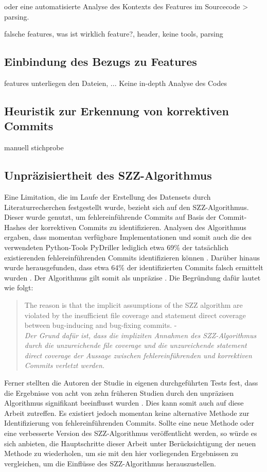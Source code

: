 oder eine automatisierte Analyse des Kontexts des Features im Sourcecode > parsing.


falsche features, was ist wirklich feature?, header, keine tools, parsing

\subsection*{Einbindung des Bezugs zu Features}
features unterliegen den Dateien, ... Keine in-depth Analyse des Codes

\subsection*{Heuristik zur Erkennung von korrektiven Commits}
manuell
stichprobe

\subsection*{Unpräzisiertheit des SZZ-Algorithmus}

Eine Limitation, die im Laufe der Erstellung des Datensets durch Literaturrecherchen festgestellt wurde, bezieht sich auf den SZZ-Algorithmus. Dieser wurde genutzt, um fehlereinführende Commits auf Basis der Commit-Hashes der korrektiven Commits zu identifizieren. Analysen des Algorithmus ergaben, dass momentan verfügbare Implementationen und somit auch die des verwendeten Python-Tools PyDriller lediglich etwa 69\% der tatsächlich existierenden fehlereinführenden Commits identifizieren können \cite{Wen2019}. Darüber hinaus wurde herausgefunden, dass etwa 64\% der identifizierten Commits falsch ermittelt wurden \cite{Wen2019}. Der Algorithmus gilt somit als unpräzise \cite{Wen2019}. Die Begründung dafür lautet wie folgt:

\begin{quotation}
The reason is that the implicit assumptions of the SZZ algorithm
are violated by the insufficient file coverage and statement direct
coverage between bug-inducing and bug-fixing commits. - \cite{Wen2019}
\medskip \\
\textit{Der Grund dafür ist, dass die impliziten Annahmen des SZZ-Algorithmus durch die unzureichende \glqq file coverage\grqq{} und die unzureichende \glqq statement direct
coverage\grqq{} der Aussage zwischen fehlereinführenden und korrektiven Commits verletzt werden.}
\end{quotation}

Ferner stellten die Autoren der Studie in eigenen durchgeführten Tests fest, dass die Ergebnisse von acht von zehn früheren Studien durch den unpräzisen Algorithmus signifikant beeinflusst wurden \cite{Wen2019}. Dies kann somit auch auf diese Arbeit zutreffen. Es existiert jedoch momentan keine alternative Methode zur Identifizierung von fehlereinführenden Commits. Sollte eine neue Methode oder eine verbesserte Version des SZZ-Algorithmus veröffentlicht werden, so würde es sich anbieten, die Hauptschritte dieser Arbeit unter Berücksichtigung der neuen Methode zu wiederholen, um sie mit den hier vorliegenden Ergebnissen zu vergleichen, um die Einflüsse des SZZ-Algorithmus herauszustellen.

